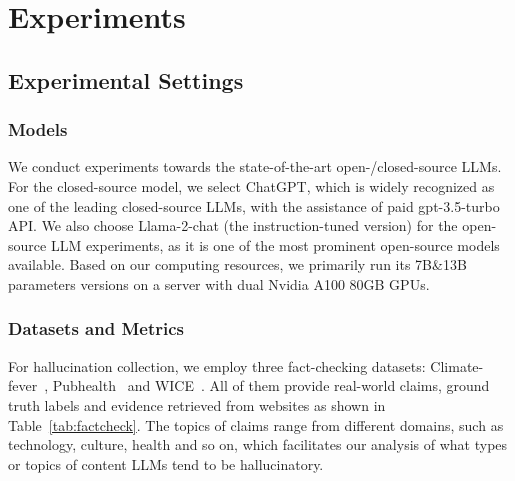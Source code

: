 \section{Experiments}
\subsection{Experimental Settings}

\subsubsection{Models}
We conduct experiments towards the state-of-the-art open-/closed-source LLMs. For the closed-source model, we select ChatGPT, which is widely recognized as one of the leading closed-source LLMs, with the assistance of paid gpt-3.5-turbo API. We also choose Llama-2-chat (the instruction-tuned version) for the open-source LLM experiments, as it is one of the most prominent open-source models available. Based on our computing resources, we primarily run its 7B\&13B parameters versions on a server with dual Nvidia A100 80GB GPUs.

\subsubsection{Datasets and Metrics}\label{sec:dataset}
For hallucination collection, we employ three fact-checking datasets: Climate-fever~\citep{diggelmann2020climate}, Pubhealth~\citep{kotonya2020explainable} and WICE~\citep{wice}. 
All of them provide real-world claims, ground truth labels and evidence retrieved from websites as shown in Table~\ref{tab:factcheck}. 
The topics of claims range from different domains, such as technology, culture, health and so on, which facilitates our analysis of what types or topics of content LLMs tend to be hallucinatory.


